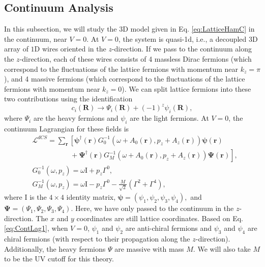 \documentclass[prb,aps,twocolumn,groupaddress,floatfix]{revtex4-1}
\begin{document}
\subsection{Continuum Analysis} \label{ssec:ContAnalysis}
In this subsection, we will study the $3$D model given in Eq. \ref{eq:LatticeHamC} in the continuum, near $V = 0$.  At $V = 0$, the system is quasi-1d, i.e., a decoupled $3$D array of $1$D wires oriented in the $z$-direction. If we pass to the continuum along the $z$-direction, each of these wires consists of 4 massless Dirac fermions (which correspond to the fluctuations of the lattice fermions with momentum near $k_z = \pi$), and 4 massive fermions (which correspond to the fluctuations of the lattice fermions with momentum near $k_z = 0$). We can split lattice fermions into these two contributions using the identification 
\begin{equation}
c_i(\bm{R}) \rightarrow \Psi_i(\bm{R}) + (-1)^z \psi_{i}(\bm{R}),
\label{eq:Lat2ContFermions}
\end{equation}
where $\Psi_i$ are the heavy fermions and $\psi_i$ are the light fermions. At $V = 0$, the continuum Lagrangian for these fields is 
\begin{equation}
\begin{split}
&\mathcal{L}^{dCS} = \sum_{\bm{r}} \left[\bm{\psi}^\dagger(\bm{r})G^{-1}_0(\omega+A_0(\bm{r}),p_z+A_z(\bm{r}))\bm{\psi}(\bm{r})\right.\\ &\phantom{====} +\left.\bm{\Psi}^\dagger(\bm{r})G^{-1}_M(\omega+A_0(\bm{r}),p_z+A_z(\bm{r}))\bm{\Psi}(\bm{r})\right], \\
&G^{-1}_0(\omega,p_z) =  \omega \text{I} + p_z \Gamma^0,\\
&G^{-1}_M(\omega,p_z) =  \omega \text{I} - p_z \Gamma^0 - \tfrac{M}{\sqrt{2}}(\Gamma^2 + \Gamma^4),
\end{split}\label{eq:ContLag1}
\end{equation}
where $\text{I}$ is the $4\times 4$ identity matrix, $\bm{\psi} = (\psi_1,\psi_2,\psi_3,\psi_4),$ and $\bm{\Psi} = (\Psi_1,\Psi_2,\Psi_3,\Psi_4)$. Here, we have only passed to the continuum in the $z$-direction. The $x$ and $y$ coordinates are still lattice coordinates. Based on Eq. \ref{eq:ContLag1}, when $V = 0$, $\psi_1$ and $\psi_2$ are anti-chiral fermions and $\psi_3$ and $\psi_4$ are chiral fermions (with respect to their propagation along the $z$-direction). Additionally, the heavy fermions $\Psi$ are massive with mass $M$. We will also take $M$ to be the UV cutoff for this theory. 
\end{document}
